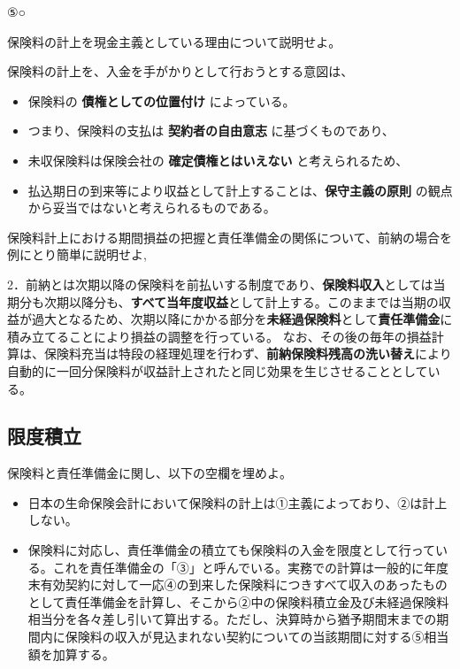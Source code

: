 \documentclass[report,gutter=10mm,fore-edge=10mm,uplatex,dvipdfmx]{jlreq}
\begin{document}
⑤○



保険料の計上を現金主義としている理由について説明せよ。


保険料の計上を、入金を手がかりとして行おうとする意図は、

\begin{itemize}
\tightlist
\item
  保険料の \textbf{債権としての位置付け} によっている。
\item
  つまり、保険料の支払は \textbf{契約者の自由意志} に基づくものであり、
\item
  未収保険料は保険会社の \textbf{確定債権とはいえない}
  と考えられるため、
\item
  払込期日の到来等により収益として計上することは、\textbf{保守主義の原則}
  の観点から妥当ではないと考えられるものである。
\end{itemize}



保険料計上における期間損益の把握と責任準備金の関係について、前納の場合を例にとり簡単に説明せよ,



2．前納とは次期以降の保険料を前払いする制度であり、\textbf{保険料収入}としては当期分も次期以降分も、\textbf{すべて当年度収益}として計上する。このままでは当期の収益が過大となるため、次期以降にかかる部分を\textbf{未経過保険料}として\textbf{責任準備金}に積み立てることにより損益の調整を行っている。
なお、その後の毎年の損益計算は、保険料充当は特段の経理処理を行わず、\textbf{前納保険料残高の洗い替え}により自動的に一回分保険料が収益計上されたと同じ効果を生じさせることとしている。

\subsection{限度積立}


保険料と責任準備金に関し、以下の空欄を埋めよ。

\begin{itemize}
\tightlist
\item
  日本の生命保険会計において保険料の計上は①主義によっており、②は計上しない。
\item
  保険料に対応し、責任準備金の積立ても保険料の入金を限度として行っている。これを責任準備金の「③」と呼んでいる。実務での計算は一般的に年度末有効契約に対して一応④の到来した保険料につきすべて収入のあったものとして責任準備金を計算し、そこから②中の保険料積立金及び未経過保険料相当分を各々差し引いて算出する。ただし、決算時から猶予期間末までの期間内に保険料の収入が見込まれない契約についての当該期間に対する⑤相当額を加算する。
\end{itemize}
\end{document}
